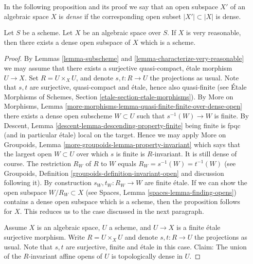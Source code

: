 \noindent
In the following proposition and its proof we say that an open subspace
$X'$ of an algebraic space $X$ is {\it dense} if the corresponding
open subset $|X'| \subset |X|$ is dense.

\begin{proposition}
\label{proposition-very-reasonable-open-dense-scheme}
Let $S$ be a scheme.
Let $X$ be an algebraic space over $S$.
If $X$ is very reasonable, then there exists a dense open subspace
of $X$ which is a scheme.
\end{proposition}

\begin{proof}
By Lemmas \ref{lemma-subscheme} and \ref{lemma-characterize-very-reasonable}
we may assume that there exists a surjective quasi-compact, \'etale morphism
$U \to X$. Set $R = U \times_X U$, and denote $s, t : R \to U$ the projections
as usual. Note that $s, t$ are surjective, quasi-compact and \'etale, hence
also quasi-finite (see
\'Etale Morphisms of Schemes, Section \ref{etale-section-etale-morphisms}).
By
More on Morphisms,
Lemma \ref{more-morphisms-lemma-quasi-finite-finite-over-dense-open}
there exists a dense open subscheme $W \subset U$ such that
$s^{-1}(W) \to W$ is finite. By
Descent, Lemma \ref{descent-lemma-descending-property-finite}
being finite is fpqc (and in particular \'etale) local on the target.
Hence we may apply
More on Groupoids, Lemma \ref{more-groupoids-lemma-property-invariant}
which says that the largest open $W \subset U$ over which $s$ is
finite is $R$-invariant. It is still dense of course.
The restriction $R_W$ of $R$ to $W$ equals $R_W = s^{-1}(W) = t^{-1}(W)$
(see Groupoids, Definition \ref{groupoids-definition-invariant-open}
and discussion following it).
By construction $s_W, t_W : R_W \to W$ are finite \'etale.
If we can show the open subspace $W/R_W \subset X$ (see
Spaces, Lemma \ref{spaces-lemma-finding-opens})
contains a dense open subspace which is a scheme, then the
proposition follows for $X$. This reduces us to the case discussed
in the next paragraph.

\medskip\noindent
Assume $X$ is an algebraic space, $U$ a scheme, and $U \to X$ is a finite
\'etale surjective morphism. Write $R = U \times_X U$ and denote
$s, t : R \to U$ the projections as usual. Note that $s, t$ are surjective,
finite and \'etale in this case. Claim:
The union of the $R$-invariant affine opens of $U$ is topologically
dense in $U$.


\end{proof}
